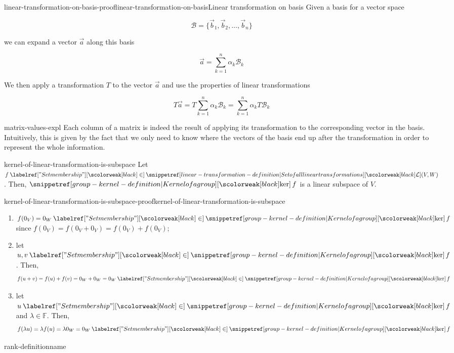 \documentclass[preview]{standalone}
\begin{document}
\begin{snippetproof}{linear-transformation-on-basis-proof}{linear-transformation-on-basis}{Linear transformation on basis}
    Given a basis for a vector space

    \[
        \mathcal{B}=\{\vec{b}_1, \vec{b}_2, \ldots, \vec{b}_n\}
    \]
    
    we can expand a vector \(\vec{a}\) along this basis
    
    \[
        \vec{a} = \sum_{k=1}^{n} \alpha_k \mathcal{B}_k
    \]
    
    We then apply a transformation \(T\) to the vector \(\vec{a}\) and use the properties of
    linear transformations
    
    \[
        T\vec{a}
        = T\sum_{k=1}^{n} \alpha_k \mathcal{B}_k
        = \sum_{k=1}^{n} \alpha_k T\mathcal{B}_k
    \]
\end{snippetproof}

\begin{snippet}{matrix-values-expl}
    Each column of a matrix is indeed the result of applying its transformation
    to the corresponding vector in the basis.
    Intuitively, this is given by the fact that we only need to know where the vectors of the basis
    end up after the transformation in order to represent the whole information.
\end{snippet}

\begin{snippetproposition}{kernel-of-linear-transformation-is-subspace}{}
    Let \(f \in \setoflineartransformations(V, W)\). Then, \(\grpker f\) is a linear subspace of \(V\).
\end{snippetproposition}

\begin{snippetproof}{kernel-of-linear-transformation-is-subspace-proof}{kernel-of-linear-transformation-is-subspace}{}
    \begin{enumerate}
        \item \(f(0_V) = 0_W \in \grpker f\) since \(f(0_V) = f(0_V + 0_V) = f(0_V) +f(0_V)\);
        \item let \(u,v \in \grpker f\). Then,
        \[
            f(u+v) = f(u) + f(v) = 0_W + 0_W = 0_W \in \grpker f
        \]
        \item let \(u \in \grpker f\) and \(\lambda \in \mathbb{F}\). Then,
        \[
            f(\lambda u) = \lambda f(u) = \lambda 0_W = 0_W \in \grpker f
        \]
    \end{enumerate}
\end{snippetproof}

\begin{snippetdefinition}{rank-definition}{name}
    \todo
\end{snippetdefinition}
\end{document}
